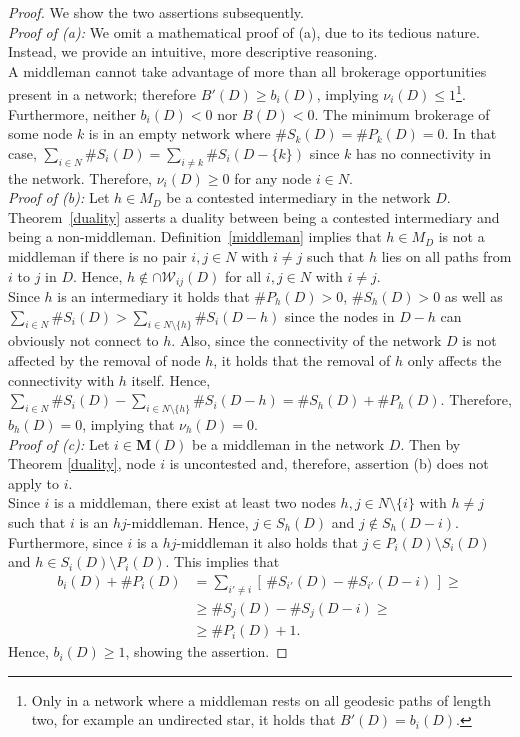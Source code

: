 \begin{proof}
We show the two assertions subsequently.
\\[1ex]
\emph{Proof of (a):}
We omit a mathematical proof of (a), due to its tedious nature. Instead, we provide an intuitive, more descriptive reasoning.
\\
A middleman cannot take advantage of more than all brokerage opportunities present in a network; therefore $B'(D) \geqslant b_{i}(D)$, implying $\nu_{i}(D) \leqslant 1$\footnote{Only in a network where a middleman rests on all geodesic paths of length two, for example an undirected star, it holds that $B'(D) = b_{i}(D)$.}.
\\
Furthermore, neither $b_{i}(D) < 0$ nor $B(D) < 0$. The minimum brokerage of some node $k$ is in an empty network where $\# S_{k}(D) = \# P_{k}(D) = 0$. In that case, $\sum_{i \in N} \# S_{i}(D) = \sum_{i \neq k} \# S_{i}(D - \{k\})$ since $k$ has no connectivity in the network. Therefore, $\nu_i (D) \geqslant 0$ for any node $i \in N$.
\\[1ex]
\emph{Proof of (b):}
Let $h \in M_D$ be a contested intermediary in the network $D$. Theorem~\ref{duality} asserts a duality between being a contested intermediary and being a non-middleman. Definition~\ref{middleman} implies that $h \in M_D$ is not a middleman if there is no pair $i,j \in N$ with $i \neq j$ such that $h$ lies on all paths from $i$ to $j$ in $D$. Hence, $h \notin \cap \mathcal{W}_{ij}(D)$ for all $i,j \in N$ with $i \neq j$.
\\
Since $h$ is an intermediary it holds that $\# P_{h}(D) > 0$, $\# S_{h}(D) > 0$ as well as $\sum_{i \in N} \# S_{i}(D) > \sum_{i \in N \setminus \{h\}} \# S_{i}(D - h)$ since the nodes in $D - h$ can obviously not connect to $h$. Also, since the connectivity of the network $D$ is not affected by the removal of node $h$, it holds that the removal of $h$ only affects the connectivity with $h$ itself. Hence, $\sum_{i \in N} \# S_{i}(D) - \sum_{i \in N \setminus \{ h \}} \# S_{i}(D - h) = \# S_{h}(D) + \# P_{h}(D)$. Therefore, $b_h (D) =0$, implying that $\nu_{h} (D) = 0$.
\\[1ex]
\emph{Proof of (c):}
Let $i \in \mathbf M (D)$ be a middleman in the network $D$. Then by Theorem \ref{duality}, node $i$ is uncontested and, therefore, assertion (b) does not apply to $i$.
\\
Since $i$ is a middleman, there exist at least two nodes $h,j \in N \setminus \{ i \}$ with $h \neq j$ such that $i$ is an $hj$-middleman. Hence, $j \in S_h (D)$ and $j \notin S_h (D-i)$. Furthermore, since $i$ is a $hj$-middleman it also holds that $j \in P_i (D) \setminus S_i (D)$ and $h \in S_i (D) \setminus P_i(D)$. This implies that
\begin{align*}
	b_i(D) + \#P_{i}(D) & =  \sum_{i' \neq i} \left[ \, \# S_{i'}(D) - \# S_{i'}(D - i) \, \right] \geqslant \\
	& \geqslant \# S_{j}(D) - \# S_{j}(D - i) \geqslant \\
	& \geqslant \#P_{i}(D) +1.
\end{align*}
Hence, $b_i(D) \geqslant 1$, showing the assertion.
\end{proof}

